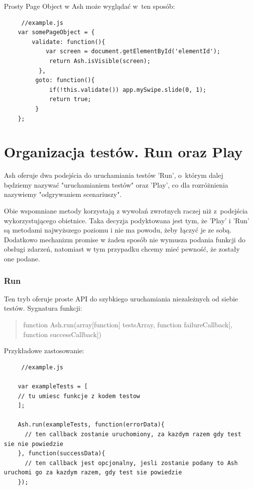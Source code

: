 \documentclass[brudnopis]{xmgr}
\begin{document}
Prosty Page Object w Ash może wyglądać w~ten sposób:

\begin{lstlisting}
     //example.js
    var somePageObject = {
    	validate: function(){
      	    var screen = document.getElementById('elementId');
             return Ash.isVisible(screen);
          },
         goto: function(){
             if(!this.validate()) app.mySwipe.slide(0, 1);
             return true;
         }
    };
\end{lstlisting}

\section{Organizacja testów. Run oraz Play}

Ash oferuje dwa podejścia do uruchamiania testów 'Run', o~którym dalej będziemy nazywać "uruchamianiem testów" oraz 'Play', co dla rozróżnienia nazywiemy "odgrywaniem scenariuszy".

Obie wspomniane metody korzystają z wywołań zwrotnych raczej niż z~podejścia wykorzystującego obietnice. Taka decyzja podyktowana jest tym, że 'Play' i 'Run' są  metodami najwyższego poziomu i nie ma powodu, żeby łączyć je ze sobą. Dodatkowo mechanizm promise w żaden sposób nie wymusza podania funkcji do obsługi zdarzeń, natomiast w tym przypadku chcemy mieć pewność, że zostały one podane.  

\subsubsection{Run}

Ten tryb oferuje proste API do szybkiego uruchamiania niezależnych od siebie testów. Sygnatura funkcji: 

\begin{quote}
function Ash.run(array[function] testsArray, function failureCallback[, function successCallback]) 
\end{quote}

Przykładowe zastosowanie: 

\begin{lstlisting}
     //example.js

    var exampleTests = [
	// tu umiesc funkcje z kodem testow
    ];

    Ash.run(exampleTests, function(errorData){
      // ten callback zostanie uruchomiony, za kazdym razem gdy test sie nie powiedzie
    }, function(successData){
      // ten callback jest opcjonalny, jesli zostanie podany to Ash uruchomi go za kazdym razem, gdy test sie powiedzie
    });
\end{lstlisting}
\end{document}

